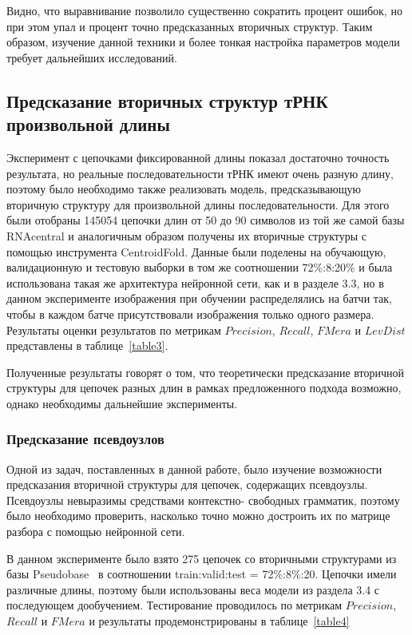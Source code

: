 \documentclass[14pt]{matmex-diploma-custom}
\begin{document}


Видно, что выравнивание позволило существенно сократить процент ошибок, но при этом упал и процент точно предсказанных вторичных структур. Таким образом, изучение данной техники и более тонкая настройка параметров модели требует дальнейших исследований.

\subsection{Предсказание вторичных структур тРНК произвольной длины}
Эксперимент с цепочками фиксированной длины показал достаточно точность результата, но реальные последовательности тРНК имеют очень разную длину, поэтому было необходимо также реализовать модель, предсказывающую вторичную структуру для произвольной длины последовательности. Для этого были отобраны 145054 цепочки длин от 50 до 90 символов из той же самой базы RNAcentral и аналогичным образом получены их вторичные структуры с помощью инструмента CentroidFold. Данные были поделены на обучающую, валидационную и тестовую выборки в том же соотношении 72\%:8\5:20\% и была использована такая же архитектура нейронной сети, как и в разделе 3.3, но в данном эксперименте изображения при обучении распределялись на батчи так, чтобы в каждом батче присутствовали изображения только одного размера.
Результаты оценки результатов по метрикам $Precision$, $Recall$, $FMera$ и $LevDist$ представлены в таблице~\ref{table3}.



Полученные результаты говорят о том, что теоретически предсказание вторичной структуры для цепочек разных длин в рамках предложенного подхода возможно, однако необходимы дальнейшие эксперименты.

\subsubsection{Предсказание псевдоузлов}
Одной из задач, поставленных в данной работе, было изучение возможности предсказания вторичной структуры для цепочек, содержащих псевдоузлы. Псевдоузлы невыразимы средствами контекстно- \linebreak свободных грамматик, поэтому было необходимо проверить, насколько точно можно достроить их по матрице разбора с помощью нейронной сети.

В данном эксперименте было взято 275 цепочек со вторичными структурами из базы Pseudobase~\cite{pseudobase} в соотношении train:valid:test = 72\%:8\%:20. Цепочки имели различные длины, поэтому были использованы веса модели из раздела 3.4 с последующем дообучением. Тестирование проводилось по метрикам $Precision$, $Recall$ и $FMera$ и результаты продемонстрированы в таблице~\ref{table4}
\end{document}

